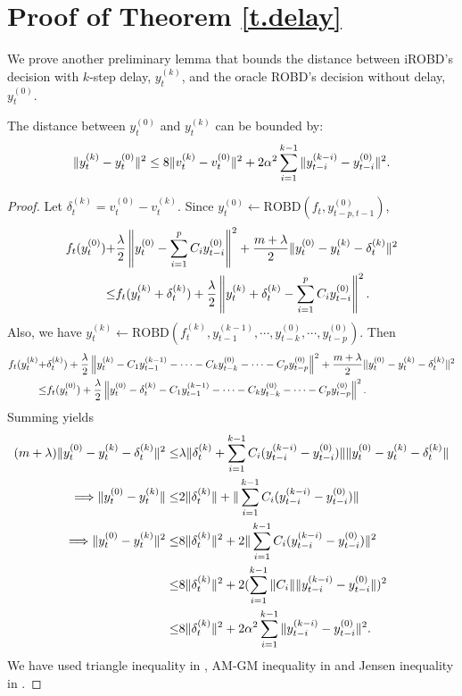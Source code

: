 \section{Proof of Theorem \ref{t.delay}}\label{appendix.delay}
We prove another preliminary lemma that bounds the distance between iROBD's decision with $k$-step delay, $y_t^{(k)}$, and the oracle ROBD's decision without delay, $y_t^{(0)}$. 
\begin{lemma}\label{l.bound}
The distance between $y_t^{(0)}$ and $y_t^{(k)}$ can be bounded by:
    \begin{align}
        \|y_t^{(k)}-y_t^{(0)}\|^2\le8\|v_t^{(k)}-v_t^{(0)}\|^2+2\alpha^2\sum_{i=1}^{k-1}\|y_{t-i}^{(k-i)}-y_{t-i}^{(0)}\|^2.\notag
    \end{align}
\end{lemma}
\begin{proof} Let $\delta_t^{(k)}=v_t^{(0)}-v_t^{(k)}$. Since $y_{t}^{(0)}\leftarrow \mathrm{ROBD}(f_{t},y_{t-p,t-1}^{(0)})$,
\begin{align}
    f_t(y_t^{(0)})+&\frac{\lambda}{2}\left\|y_t^{(0)}-\sum_{i=1}^pC_iy_{t-i}^{(0)}\right\|^2+\frac{m+\lambda}{2}\|y_t^{(0)}-y_t^{(k)}-\delta_t^{(k)}\|^2\notag\\
    \le&f_t(y_t^{(k)}+\delta_t^{(k)})+\frac{\lambda}{2}\left\|y_t^{(k)}+\delta_t^{(k)}-\sum_{i=1}^pC_iy_{t-i}^{(0)}\right\|^2.\notag
\end{align}
Also, we have $y_{t}^{(k)}\leftarrow\mathrm{ROBD}(f_{t}^{(k)},y_{t-1}^{(k-1)},\cdots,y_{t-k}^{(0)},\cdots,y_{t-p}^{(0)})$. Then
\begin{align}
    f_t(y_t^{(k)}+&\delta_t^{(k)})+\frac{\lambda}{2}\left\|y_t^{(k)}-C_1y_{t-1}^{(k-1)}-\cdots-C_ky_{t-k}^{(0)}-\cdots-C_py_{t-p}^{(0)}\right\|^2+\frac{m+\lambda}{2}\|y_t^{(0)}-y_t^{(k)}-\delta_t^{(k)}\|^2\notag\\
   \le &f_t(y_t^{(0)})+\frac{\lambda}{2}\left\|y_t^{(0)}-\delta_t^{(k)}-C_1y_{t-1}^{(k-1)}-\cdots-C_ky_{t-k}^{(0)}-\cdots-C_py_{t-p}^{(0)}\right\|^2.\notag
\end{align}
Summing yields
\begin{subequations}
\begin{align}
    (m+\lambda)\|y_t^{(0)}-y_t^{(k)}-\delta_t^{(k)}\|^2\le&\lambda\|\delta_t^{(k)}+\sum_{i=1}^{k-1}C_i(y_{t-i}^{(k-i)}-y_{t-i}^{(0)})\|\|y_t^{(0)}-y_t^{(k)}-\delta_t^{(k)}\|\notag\\
\Longrightarrow\|y_t^{(0)}-y_t^{(k)}\|\le&2\|\delta_t^{(k)}\|+\|\sum_{i=1}^{k-1}C_i(y_{t-i}^{(k-i)}-y_{t-i}^{(0)})\|\label{a.a.e.1.1}\\
\Longrightarrow\|y_t^{(0)}-y_t^{(k)}\|^2\le&8\|\delta_t^{(k)}\|^2+2\|\sum_{i=1}^{k-1}C_i(y_{t-i}^{(k-i)}-y_{t-i}^{(0)})\|^2\label{a.a.e.1.2}\\
\le&8\|\delta_t^{(k)}\|^2+2(\sum_{i=1}^{k-1}\|C_i\|\|y_{t-i}^{(k-i)}-y_{t-i}^{(0)}\|)^2\label{a.a.e.1.3}\\
\le&8\|\delta_t^{(k)}\|^2+2\alpha^2\sum_{i=1}^{k-1}\|y_{t-i}^{(k-i)}-y_{t-i}^{(0)}\|^2.\notag
\end{align}
\end{subequations}
We have used triangle inequality in , AM-GM inequality in  and Jensen inequality in . 
\end{proof}

